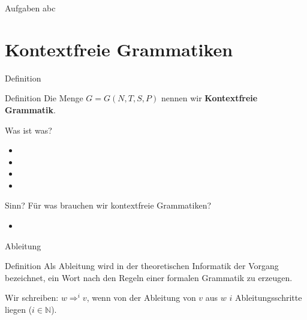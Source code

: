 	
	\begin{frame}{Aufgaben}
		abc
	\end{frame}
	
	
	\section{Kontextfreie Grammatiken}
	\begin{frame}{Definition}
		\begin{block}{Definition}
        	Die Menge $G = G \left( N, T, S, P \right)$ nennen wir 
        	\textbf{Kontextfreie Grammatik}.
    	\end{block}
    	\pause
        \begin{block}{Was ist was?}
            \begin{itemize}
                \item {}
                \item {}
                \item {}
                \item {}
            \end{itemize}
    	\end{block}
	\end{frame}
	
	\begin{frame}{Sinn?}
		Für was brauchen wir kontextfreie Grammatiken?		
		\begin{itemize}
			\item
		\end{itemize}
	\end{frame}
	
	
	\begin{frame}{Ableitung}
    	\begin{block}{Definition}
        	Als Ableitung wird in der theoretischen Informatik der Vorgang 
        	bezeichnet, ein Wort nach den Regeln einer formalen 
        	Grammatik zu erzeugen.
   		\end{block}
   		
    	Wir schreiben: $w \Rightarrow^i v$, wenn von der Ableitung 
    	von $v$ aus $w$ $i$ Ableitungsschritte liegen ($i \in \mathbb{N}$).
    
    	\pause
	\end{frame}

